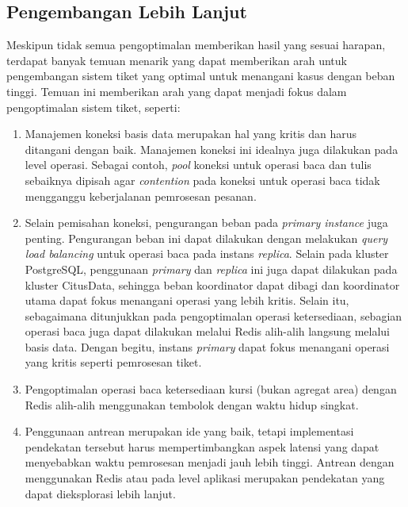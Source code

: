 \pagebreak

\subsection{Pengembangan Lebih Lanjut}
\label{pengembangan-lebih-lanjut}

Meskipun tidak semua pengoptimalan memberikan hasil yang sesuai harapan, terdapat banyak temuan menarik yang dapat memberikan arah untuk pengembangan sistem tiket yang optimal untuk menangani kasus dengan beban tinggi. Temuan ini memberikan arah yang dapat menjadi fokus dalam pengoptimalan sistem tiket, seperti:

\begin{enumerate}
    \item Manajemen koneksi basis data merupakan hal yang kritis dan harus ditangani dengan baik. Manajemen koneksi ini idealnya juga dilakukan pada level operasi. Sebagai contoh, \textit{pool} koneksi untuk operasi baca dan tulis sebaiknya dipisah agar \textit{contention} pada koneksi untuk operasi baca tidak mengganggu keberjalanan pemrosesan pesanan.
    \item Selain pemisahan koneksi, pengurangan beban pada \textit{primary instance} juga penting. Pengurangan beban ini dapat dilakukan dengan melakukan \textit{query load balancing} untuk operasi baca pada instans \textit{replica}. Selain pada kluster PostgreSQL, penggunaan \textit{primary} dan \textit{replica} ini juga dapat dilakukan pada kluster CitusData, sehingga beban koordinator dapat dibagi dan koordinator utama dapat fokus menangani operasi yang lebih kritis. Selain itu, sebagaimana ditunjukkan pada pengoptimalan operasi ketersediaan, sebagian operasi baca juga dapat dilakukan melalui Redis alih-alih langsung melalui basis data. Dengan begitu, instans \textit{primary} dapat fokus menangani operasi yang kritis seperti pemrosesan tiket.
    \item Pengoptimalan operasi baca ketersediaan kursi (bukan agregat area) dengan Redis alih-alih menggunakan tembolok dengan waktu hidup singkat.
    \item Penggunaan antrean merupakan ide yang baik, tetapi implementasi pendekatan tersebut harus mempertimbangkan aspek latensi yang dapat menyebabkan waktu pemrosesan menjadi jauh lebih tinggi. Antrean dengan menggunakan Redis atau pada level aplikasi merupakan pendekatan yang dapat dieksplorasi lebih lanjut.
\end{enumerate}
